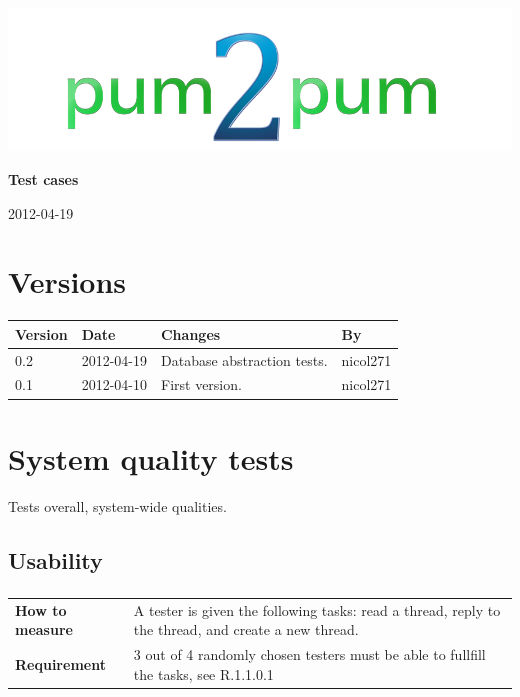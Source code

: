 \documentclass[a4paper, 12pt, titlepage]{article}
\newcommand{\urequirement}[2]{
	\subsubsection{}
	\begin{tabular}{l p{10cm}}
	\bf{How to measure} & 
		#1\\
	\bf{Requirement} & 
		#2\\
	\end{tabular}
}
\begin{document}
	
	\begin{titlepage}
		
		\includegraphics[scale=0.4]{logoNormal.png}
		
		\vspace{6cm}
		
		\begin{center}
			\Huge{\textbf{Test cases}} %
			
			\vspace{0.5cm}
			
			\huge{2012-04-19} %
		\end{center}
		
	\end{titlepage}
	
	\tableofcontents
	\newpage
	
	\section*{Versions}
	\begin{tabularx}{1\textwidth}{|l|l|X|l|}
		\hline
		\bf{Version} & \bf{Date} & \bf{Changes} & \bf{By} \\
		\hline
		0.2 & 2012-04-19 & Database abstraction tests. & nicol271 \\
		\hline
		0.1 & 2012-04-10 & First version. & nicol271 \\
		\hline
	\end{tabularx}
	\newpage
	
	\section{System quality tests}
	Tests overall, system-wide qualities.

	\subsection{Usability}
		\urequirement
		{
			A tester is given the following tasks: read a thread, reply to the thread, and create a new thread.
		}{
			3 out of 4 randomly chosen testers must be able to fullfill the tasks, see R.1.1.0.1
		}
\end{document}

